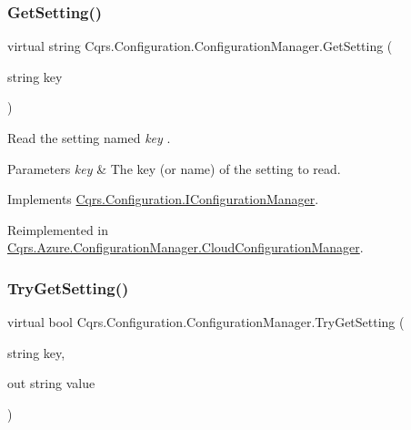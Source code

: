 \subsubsection{\texorpdfstring{Get\+Setting()}{GetSetting()}}
{\footnotesize\ttfamily virtual string Cqrs.\+Configuration.\+Configuration\+Manager.\+Get\+Setting (\begin{DoxyParamCaption}\item[{string}]{key }\end{DoxyParamCaption})\hspace{0.3cm}{\ttfamily [virtual]}}



Read the setting named {\itshape key} . 


\begin{DoxyParams}{Parameters}
{\em key} & The key (or name) of the setting to read.\\
\hline
\end{DoxyParams}


Implements \hyperlink{interfaceCqrs_1_1Configuration_1_1IConfigurationManager_a9f7b7d4d8c26a0589f01c8a7f69901ef_a9f7b7d4d8c26a0589f01c8a7f69901ef}{Cqrs.\+Configuration.\+I\+Configuration\+Manager}.



Reimplemented in \hyperlink{classCqrs_1_1Azure_1_1ConfigurationManager_1_1CloudConfigurationManager_a48228b7e2204a2449426de32cd6ecc65_a48228b7e2204a2449426de32cd6ecc65}{Cqrs.\+Azure.\+Configuration\+Manager.\+Cloud\+Configuration\+Manager}.

\mbox{\label{classCqrs_1_1Configuration_1_1ConfigurationManager_ad87af2a011af065d6d3e0d2ff01c7f6e_ad87af2a011af065d6d3e0d2ff01c7f6e}} 
\subsubsection{\texorpdfstring{Try\+Get\+Setting()}{TryGetSetting()}\hspace{0.1cm}{\footnotesize\ttfamily [1/2]}}
{\footnotesize\ttfamily virtual bool Cqrs.\+Configuration.\+Configuration\+Manager.\+Try\+Get\+Setting (\begin{DoxyParamCaption}\item[{string}]{key,  }\item[{out string}]{value }\end{DoxyParamCaption})\hspace{0.3cm}{\ttfamily [virtual]}}



